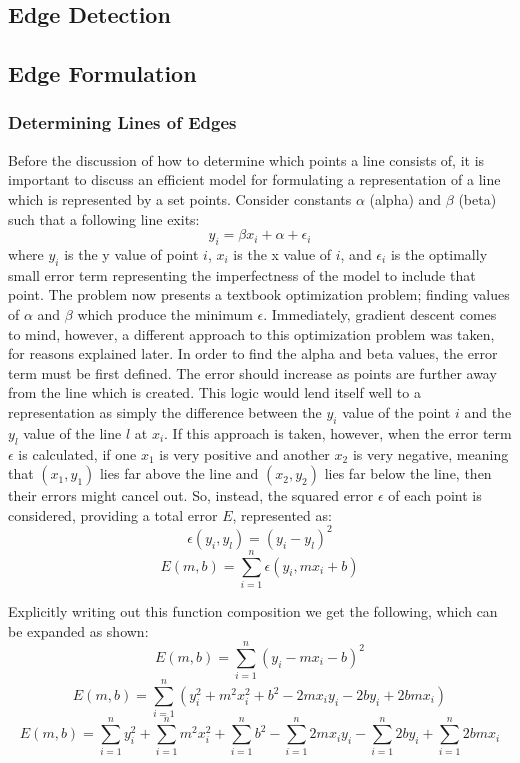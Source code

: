 \subsection{Edge Detection}
\subsection{Edge Formulation}
\subsubsection{Determining Lines of Edges}
Before the discussion of how to determine which points a line consists of, it is important to discuss an efficient model for formulating a representation of a line which is represented by a set points. Consider constants $\alpha$ (alpha) and $\beta$ (beta) such that a following line exits:
$$y_i=\beta x_i+\alpha+\epsilon_i$$
where $y_i$ is the y value of point $i$, $x_i$ is the x value of $i$, and $\epsilon_i$ is the optimally small error term representing the imperfectness of the model to include that point. The problem now presents a textbook optimization problem; finding values of $\alpha$ and $\beta$ which produce the minimum $\epsilon$. Immediately, gradient descent comes to mind, however, a different approach to this optimization problem was taken, for reasons explained later. In order to find the alpha and beta values, the error term must be first defined. The error should increase as points are further away from the line which is created. This logic would lend itself well to a representation as simply the difference between the $y_i$ value of the point $i$ and the $y_l$ value of the line $l$ at $x_i$. If this approach is taken, however, when the error term $\epsilon$ is calculated, if one $x_1$ is very positive and another $x_2$ is very negative, meaning that $(x_1,y_1)$ lies far above the line and $(x_2,y_2)$ lies far below the line, then their errors might cancel out. So, instead, the squared error $\epsilon$ of each point  is considered, providing a total error $E$, represented as: $$\epsilon(y_i,y_l)=(y_i-y_l)^2$$
$$E(m,b) = \sum\limits_{i=1}^n \epsilon(y_i,mx_i+b)$$

Explicitly writing out this function composition we get the following, which can be expanded as shown:
$$E(m,b)=\sum\limits_{i=1}^n(y_i-mx_i-b)^2$$
$$E(m,b)=\sum\limits_{i=1}^n(y^2_i+m^2x^2_i+b^2-2mx_iy_i-2by_i+2bmx_i)$$
$$E(m,b)=\sum\limits_{i=1}^n y^2_i+ \sum\limits_{i=1}^n m^2x^2_i+ \sum\limits_{i=1}^n b^2-\sum\limits_{i=1}^n 2mx_iy_i-\sum\limits_{i=1}^n 2by_i+ \sum\limits_{i=1}^n 2bmx_i$$

